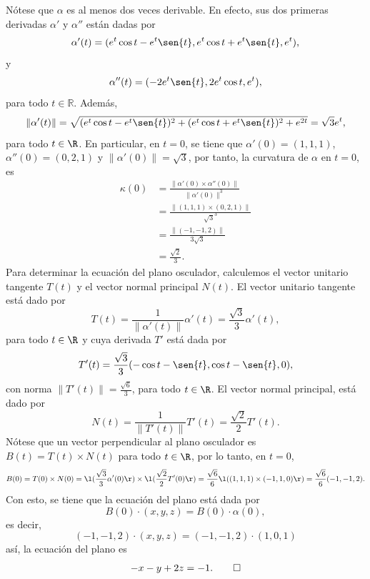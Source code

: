 \documentclass[a4,11pt]{aleph-examen}
\begin{document}
\begin{preguntas}
\begin{respuesta}
    Nótese que $\alpha$ es al menos dos veces derivable. En efecto, sus dos primeras derivadas $\alpha'$ y $\alpha''$ están dadas por
    \[
        \alpha'(t) = (e^{t}\cos{t} - e^{t}\sen{t}, e^{t}\cos{t} + e^{t}\sen{t}, e^{t}),
    \]
    y
    \[
        \alpha''(t) = (-2e^{t}\sen{t}, 2e^{t}\cos{t}, e^{t}),
    \]
    para todo $t \in \mathbb{R}$. Además,
    \[
        \| \alpha'(t) \| = \sqrt{(e^{t}\cos{t} - e^{t}\sen{t})^{2} + (e^{t}\cos{t} + e^{t}\sen{t})^2 + e^{2t}} = \sqrt{3} e^{t},
    \]
    para todo $t\in\R$. En particular, en $t = 0$, se tiene que $\alpha'(0)= (1,1,1)$, $\alpha''(0) = (0,2,1)$ y $\|\alpha'(0)\| = \sqrt{3}$, por tanto, la curvatura de $\alpha$ en $t = 0$, es
    \begin{align*}
        \kappa(0) 
            &= \frac{\|\alpha'(0) \times \alpha''(0) \|}{\| \alpha'(0) \|^{3}}\\
            &= \frac{\|(1,1,1) \times (0,2,1) \|}{\sqrt{3}^{3}}\\
            &= \frac{\|(-1,-1,2)\|}{3\sqrt{3}}\\
            &= \frac{\sqrt{2}}{3}.
    \end{align*}
    Para determinar la ecuación del plano osculador, calculemos el vector unitario tangente $T(t)$ y el vector normal principal $N(t)$. El vector unitario tangente está dado por
    \[
        T(t) = \frac{1}{\| \alpha'(t)\|}\alpha'(t) = \frac{\sqrt{3}}{3}\alpha'(t),
    \]
    para todo $t\in\R$ y cuya derivada $T'$ está dada por
    \[
        T'(t) = \frac{\sqrt{3}}{3}(-\cos{t} - \sen{t}, \cos{t} - \sen{t}, 0), 
    \]
    con norma $\| T'(t)\| = \frac{\sqrt{6}}{3}$, para todo $t \in\R$. El vector normal principal, está dado por
    \[
        N(t) = \frac{1}{\|T'(t)\|}T'(t) = \frac{\sqrt{2}}{2}T'(t).
    \]
    Nótese que un vector perpendicular al plano osculador es $B(t) = T(t) \times N(t)$ para todo $t\in\R$, por lo tanto, en $t = 0$, 
    \[
        B(0) = T(0) \times N(0) 
        = \l(\frac{\sqrt{3}}{3}\alpha'(0)\r)\times \l(\frac{\sqrt{2}}{2}T'(0)\r)
        =\frac{\sqrt{6}}{6} \l( (1,1,1) \times (-1, 1, 0) \r)
        = \frac{\sqrt{6}}{6} (-1, -1, 2).
    \]
    Con esto, se tiene que la ecuación del plano está dada por
    \[
        B(0)\cdot (x,y,z) = B(0)\cdot \alpha(0),
    \]
    es decir,
    \[
        (-1, -1, 2)\cdot(x,y,z) =(-1, -1, 2)\cdot(1, 0, 1)
    \]
    así, la ecuación del plano es
    \[
        -x - y + 2z = -1.\qedhere
    \]
\end{respuesta}



\end{preguntas}
\end{document}
